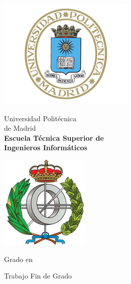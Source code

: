 \begin{titlepage}

\begin{minipage}{0.15\linewidth}
\hspace*{-2.5cm}
\noindent
\includegraphics[scale=0.5]{include/EscUpm.png} \qquad\qquad
\end{minipage}
\begin{minipage}{0.7\linewidth}
\begin{center}
\huge{ Universidad Politécnica\\de Madrid }\\
\vspace*{0.5cm}
\Large{\textbf{Escuela Técnica Superior de \\
Ingenieros Informáticos}}
\end{center}
\end{minipage}
\begin{minipage}{0.2\linewidth}
\includegraphics[scale=0.5]{include/FacInformatica.png} 
\end{minipage}

\vspace*{1cm}
\begin{center}
\Large{Grado en  \Grado{} }
\end{center}

\vspace*{1cm}
\begin{center}
\huge{ Trabajo Fin de Grado }
\end{center}


\end{titlepage}
